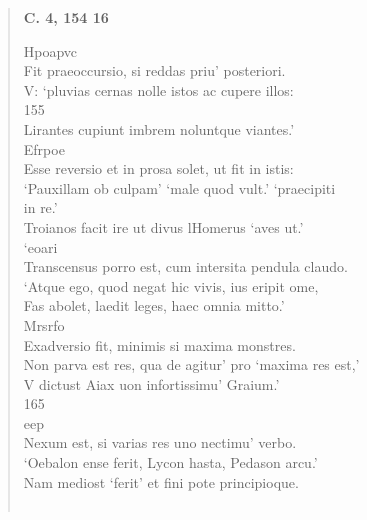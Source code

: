\documentclass[11pt, a4paper]{report}
\begin{document}
\begin{verse}
     \marginpar{[18]} \begin{center} \textbf{C. 4, 154 16} \end{center}Hpoapvc \\ Fit praeoccursio, si reddas priu’ posteriori. \\ V: ‘pluvias cernas nolle istos ac cupere illos: \\ 155 \\ Lirantes cupiunt imbrem noluntque viantes.’ \\ Efrpoe \\ Esse reversio et in prosa solet, ut fit in istis: \\ ‘Pauxillam ob culpam’ ‘male quod vult.’ ‘praecipiti \\ in re.’ \\ Troianos facit ire ut divus lHomerus ‘aves ut.’ \\ ‘eoari \\ Transcensus porro est, cum intersita pendula claudo. \\ ‘Atque ego, quod negat hic vivis, ius eripit ome, \\ Fas abolet, laedit leges, haec omnia mitto.’ \\ Mrsrfo \\ Exadversio fit, minimis si maxima monstres. \\ Non parva est res, qua de agitur’ pro ‘maxima res est,’ \\ V dictust Aiax uon infortissimu’ Graium.’ \\ 165 \\ eep \\ Nexum est, si varias res uno nectimu’ verbo. \\ ‘Oebalon ense ferit, Lycon hasta, Pedason arcu.’ \\ Nam mediost ‘ferit’ et fini pote principioque. \\ 
        ﻿\pagebreak 

\end{verse}
\end{document}
